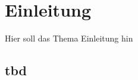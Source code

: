 
\chapter{Einleitung}

Hier soll das Thema Einleitung hin

\cite{shanahan2015large}

\section{tbd} 
